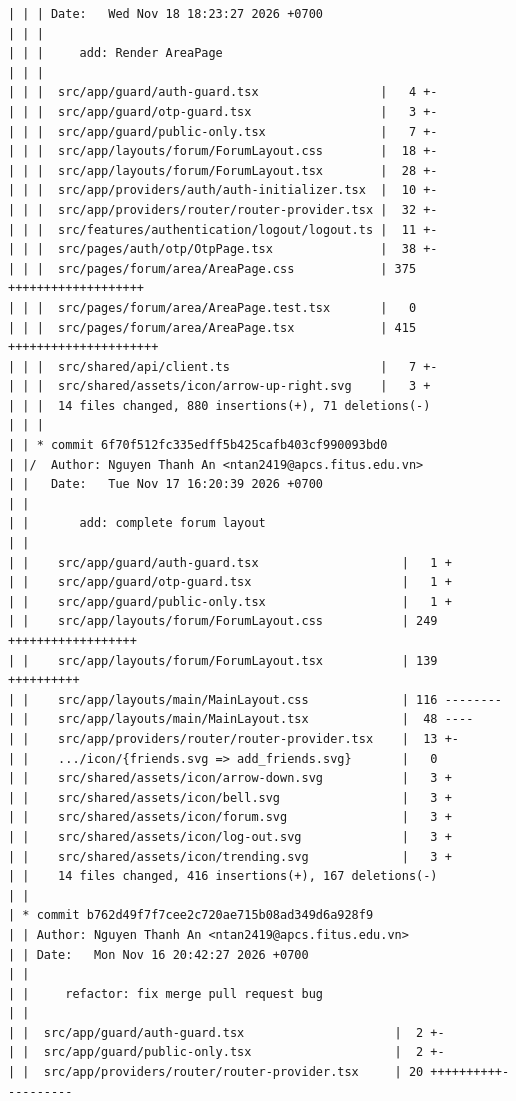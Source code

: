 \documentclass[12pt]{article}
\begin{document}
\begin{lstlisting}[numbers=none,breaklines=true]
| | | Date:   Wed Nov 18 18:23:27 2026 +0700
| | |
| | |     add: Render AreaPage
| | |
| | |  src/app/guard/auth-guard.tsx                 |   4 +-
| | |  src/app/guard/otp-guard.tsx                  |   3 +-
| | |  src/app/guard/public-only.tsx                |   7 +-
| | |  src/app/layouts/forum/ForumLayout.css        |  18 +-
| | |  src/app/layouts/forum/ForumLayout.tsx        |  28 +-
| | |  src/app/providers/auth/auth-initializer.tsx  |  10 +-
| | |  src/app/providers/router/router-provider.tsx |  32 +-
| | |  src/features/authentication/logout/logout.ts |  11 +-
| | |  src/pages/auth/otp/OtpPage.tsx               |  38 +-
| | |  src/pages/forum/area/AreaPage.css            | 375 +++++++++++++++++++
| | |  src/pages/forum/area/AreaPage.test.tsx       |   0
| | |  src/pages/forum/area/AreaPage.tsx            | 415 +++++++++++++++++++++
| | |  src/shared/api/client.ts                     |   7 +-
| | |  src/shared/assets/icon/arrow-up-right.svg    |   3 +
| | |  14 files changed, 880 insertions(+), 71 deletions(-)
| | |
| | * commit 6f70f512fc335edff5b425cafb403cf990093bd0
| |/  Author: Nguyen Thanh An <ntan2419@apcs.fitus.edu.vn>
| |   Date:   Tue Nov 17 16:20:39 2026 +0700
| |
| |       add: complete forum layout
| |
| |    src/app/guard/auth-guard.tsx                    |   1 +
| |    src/app/guard/otp-guard.tsx                     |   1 +
| |    src/app/guard/public-only.tsx                   |   1 +
| |    src/app/layouts/forum/ForumLayout.css           | 249 ++++++++++++++++++
| |    src/app/layouts/forum/ForumLayout.tsx           | 139 ++++++++++
| |    src/app/layouts/main/MainLayout.css             | 116 --------
| |    src/app/layouts/main/MainLayout.tsx             |  48 ----
| |    src/app/providers/router/router-provider.tsx    |  13 +-
| |    .../icon/{friends.svg => add_friends.svg}       |   0
| |    src/shared/assets/icon/arrow-down.svg           |   3 +
| |    src/shared/assets/icon/bell.svg                 |   3 +
| |    src/shared/assets/icon/forum.svg                |   3 +
| |    src/shared/assets/icon/log-out.svg              |   3 +
| |    src/shared/assets/icon/trending.svg             |   3 +
| |    14 files changed, 416 insertions(+), 167 deletions(-)
| |
| * commit b762d49f7f7cee2c720ae715b08ad349d6a928f9
| | Author: Nguyen Thanh An <ntan2419@apcs.fitus.edu.vn>
| | Date:   Mon Nov 16 20:42:27 2026 +0700
| |
| |     refactor: fix merge pull request bug
| |
| |  src/app/guard/auth-guard.tsx                     |  2 +-
| |  src/app/guard/public-only.tsx                    |  2 +-
| |  src/app/providers/router/router-provider.tsx     | 20 ++++++++++----------

\end{lstlisting}
\end{document}
